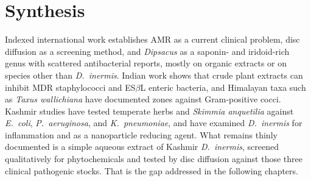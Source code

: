\section{Synthesis}
\label{sec:lit_synthesis}

Indexed international work establishes AMR as a current clinical problem, disc diffusion as a screening method, and \textit{Dipsacus} as a saponin- and iridoid-rich genus with scattered antibacterial reports, mostly on organic extracts or on species other than \textit{D.\ inermis}. Indian work shows that crude plant extracts can inhibit MDR staphylococci and ES$\beta$L enteric bacteria, and Himalayan taxa such as \textit{Taxus wallichiana} have documented zones against Gram-positive cocci. Kashmir studies have tested temperate herbs and \textit{Skimmia anquetilia} against \textit{E.\ coli}, \textit{P.\ aeruginosa}, and \textit{K.\ pneumoniae}, and have examined \textit{D.\ inermis} for inflammation and as a nanoparticle reducing agent. What remains thinly documented is a simple aqueous extract of Kashmir \textit{D.\ inermis}, screened qualitatively for phytochemicals and tested by disc diffusion against those three clinical pathogenic stocks. That is the gap addressed in the following chapters.
